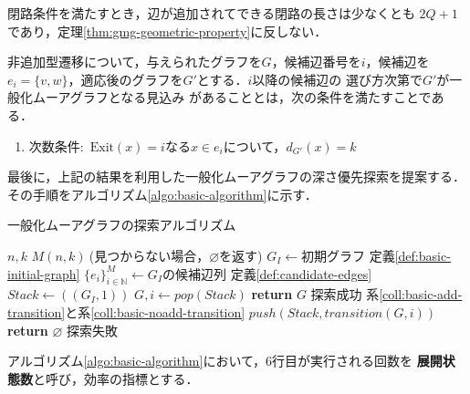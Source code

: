 閉路条件を満たすとき，辺が追加されてできる閉路の長さは少なくとも
$2Q+1$であり，定理\ref{thm:gmg-geometric-property}に反しない．

\begin{corollary-without-proof}\rm
  \label{coll:basic-noadd-transition}
  非追加型遷移について，与えられたグラフを$G$，候補辺番号を$i$，候補辺を
  $e_i=\{v,w\}$，適応後のグラフを$G'$とする．$i$以降の候補辺の
  選び方次第で$G'$が一般化ムーアグラフとなる見込み
  があることとは，次の条件を満たすことである．
  \begin{enumerate}
  \item 次数条件:\ $\text{Exit}(x)=i$なる$x\in e_i$について，$d_{G'}(x)=k$
  \end{enumerate}
\end{corollary-without-proof}

最後に，上記の結果を利用した一般化ムーアグラフの深さ優先探索を提案する．
その手順をアルゴリズム\ref{algo:basic-algorithm}に示す．
\begin{algorithm}[H]
  \caption{一般化ムーアグラフの探索アルゴリズム}
  \label{algo:basic-algorithm}
  \begin{algorithmic}[1]
    \Require $n,k$
    \Ensure $M(n,k)\:$(見つからない場合，$\varnothing$を返す)
    \State $G_I\gets\text{初期グラフ}$
    \Comment 定義\ref{def:basic-initial-graph}
    \State $\{e_i\}_{i\in\mathbb{N}}^M\gets G_I\text{の候補辺列}$
    \Comment 定義\ref{def:candidate-edges}
    \State $Stack\gets((G_I,1))$
    \State $G,i\gets pop(Stack)$
    \State \textbf{return} $G$
    \Comment 探索成功
    \EndIf
    \Comment 系\ref{coll:basic-add-transition}と系\ref{coll:basic-noadd-transition}
    \State $push(Stack,transition(G,i))$
    \EndIf
    \EndFor
    \EndWhile
    \State \textbf{return} $\varnothing$
    \Comment 探索失敗
    \EndProcedure
  \end{algorithmic}
\end{algorithm}
アルゴリズム\ref{algo:basic-algorithm}において，6行目が実行される回数を
\textbf{展開状態数}と呼び，効率の指標とする．

